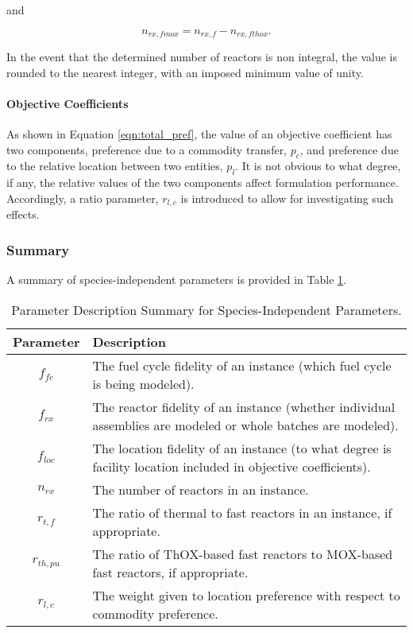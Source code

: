 and

\begin{equation}
n_{rx, fmox} = n_{rx, f} - n_{rx, fthox}.
\end{equation}

In the event that the determined number of reactors is non integral, the value
is rounded to the nearest integer, with an imposed minimum value of unity.

\paragraph{Objective Coefficients}

As shown in Equation \ref{eqn:total_pref}, the value of an objective coefficient
has two components, preference due to a commodity transfer, $p_c$, and
preference due to the relative location between two entities, $p_l$. It is not
obvious to what degree, if any, the relative values of the two components affect
formulation performance. Accordingly, a ratio parameter, $r_{l, c}$ is
introduced to allow for investigating such effects.

\subsubsection{Summary}

A summary of species-independent parameters is provided in Table
\ref{tbl:global_params}.

\begin{table}[h]
\centering
\caption{Parameter Description Summary for Species-Independent Parameters.}
\label{tbl:global_params}
\begin{tabularx}{\columnwidth-10pt}{|c|X|} %
\hline
Parameter    & 
Description
\\ \hline
$f_{fc}$     & 
The fuel cycle fidelity of an instance (which fuel cycle is being modeled).
\\ \hline
$f_{rx}$   & 
The reactor fidelity of an instance (whether individual assemblies are modeled
or whole batches are modeled).  
\\ \hline
$f_{loc}$    & 
The location fidelity of an instance (to what degree is facility location
included in objective coefficients).
\\ \hline
$n_{rx}$   & 
The number of reactors in an instance.
\\ \hline
$r_{t, f}$   & 
The ratio of thermal to fast reactors in an instance, if appropriate.
\\ \hline
$r_{th, pu}$ & 
The ratio of ThOX-based fast reactors to MOX-based fast reactors, if appropriate.
\\ \hline
$r_{l, c}$ & 
The weight given to location preference with respect to commodity preference.
\\ \hline
\end{tabularx}
\end{table}

